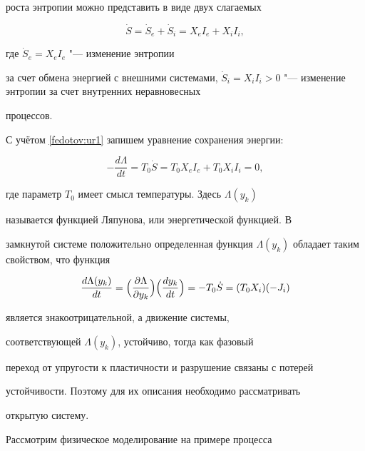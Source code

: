 роста энтропии можно представить в виде двух слагаемых

\begin{equation}

\dot{S}=\dot{S}_{e} + \dot{S}_{i} =X_{e} I_{e} +X_{i} I_{i},

\label{fedotov:ur1}

\end{equation}

\noindent где $\dot{S}_{e} =X_{e} I_{e}$ "--- изменение энтропии

за счет обмена энергией с внешними системами, $\dot{S}_{i} =X_{i}

I_{i} >0$ "--- изменение энтропии за счет внутренних неравновесных

процессов.



С учётом \eqref{fedotov:ur1} запишем уравнение сохранения энергии:

$$

-\frac{d\Lambda }{dt} =T_{0} \dot{S}=T_{0} X_{e} I_{e} +T_{0}

X_{i} I_{i} =0,

$$

где параметр $T_0$ имеет смысл температуры. Здесь $\Lambda (y_k)$

называется функцией Ляпунова, или энергетической функцией. В

замкнутой системе положительно определенная функция $\Lambda

(y_k)$ обладает таким свойством, что функция

\begin{equation*}

\frac{d\Lambda (y_k)}{dt} =\Bigl(\frac{\partial \Lambda }{\partial y_{k} } \Bigr) \Bigl(\frac{dy_{k} }{dt} \Bigr)=-T_0

\dot{S}=(T_0 X_i) (-J_i)

\end{equation*}

\noindent является знакоотрицательной, а движение системы,

соответствующей $\Lambda (y_k)$, устойчиво, тогда как фазовый

переход от упругости к пластичности и разрушение связаны с потерей

устойчивости. Поэтому для их описания необходимо рассматривать

открытую систему.



Рассмотрим физическое моделирование на примере процесса

